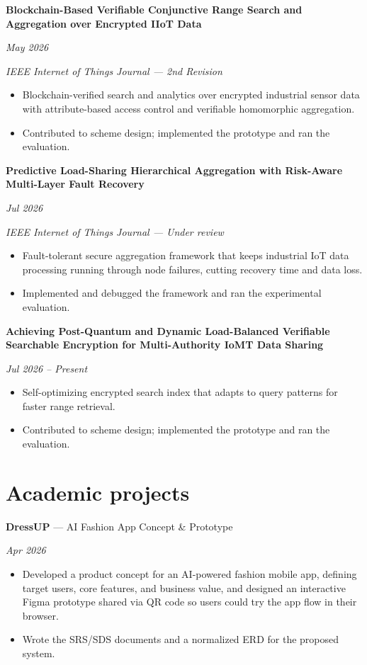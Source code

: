 \documentclass[11pt,a4paper]{article}
\newcommand{\entry}[2]{%
  \begin{minipage}[t]{0.85\textwidth}\raggedright #1\end{minipage}%
  \hfill%
  \begin{minipage}[t]{0.15\textwidth}\raggedleft\textit{#2}\end{minipage}%
  \par\vspace{1pt}%
}
\newenvironment{details}
{\begin{itemize}[leftmargin=0.5em,topsep=2pt,itemsep=0pt,parsep=0pt]}
{\end{itemize}\vspace{-3pt}}
\newcommand{\venue}[1]{\textit{#1}\par}
\begin{document}
\entry{\textbf{Blockchain-Based Verifiable Conjunctive Range Search and Aggregation over
Encrypted IIoT Data}}{May 2026}
\venue{IEEE Internet of Things Journal --- 2nd Revision}
\begin{details}
  \item Blockchain-verified search and analytics over encrypted industrial sensor data
        with attribute-based access control and verifiable homomorphic aggregation.
  \item Contributed to scheme design; implemented the prototype and ran the evaluation.
\end{details}

\entry{\textbf{Predictive Load-Sharing Hierarchical Aggregation with Risk-Aware
       Multi-Layer Fault Recovery}}{Jul 2026}
\venue{IEEE Internet of Things Journal --- Under review}
\begin{details}
  \item Fault-tolerant secure aggregation framework that keeps industrial IoT data
        processing running through node failures, cutting recovery time and data loss.
  \item Implemented and debugged the framework and ran the experimental evaluation.
\end{details}

\entry{\textbf{Achieving Post-Quantum and Dynamic Load-Balanced Verifiable Searchable
       Encryption for Multi-Authority IoMT Data Sharing}}{Jul 2026 -- Present}
\begin{details}
  \item Self-optimizing encrypted search index that adapts to query patterns for faster
        range retrieval.
  \item Contributed to scheme design; implemented the prototype and ran the evaluation.
\end{details}

\section{Academic projects}

\entry{\textbf{DressUP} --- AI Fashion App Concept \& Prototype}{Apr 2026}
\begin{details}
  \item Developed a product concept for an AI-powered fashion mobile app, defining target
        users, core features, and business value, and designed an interactive Figma
        prototype shared via QR code so users could try the app flow in their browser.
  \item Wrote the SRS/SDS documents and a normalized ERD for the proposed system.
\end{details}
\end{document}
